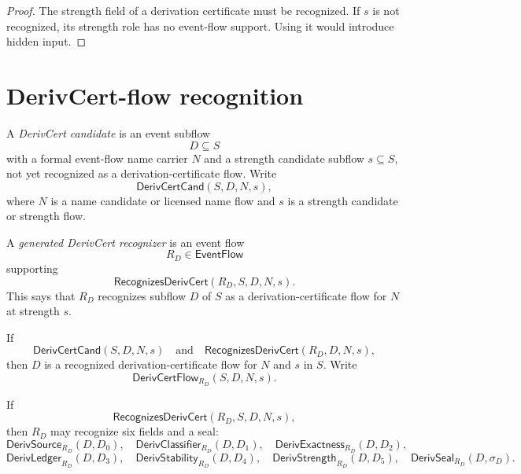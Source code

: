 \begin{proof}
The strength field of a derivation certificate must be recognized. If $s$ is not recognized, its strength role has no event-flow support. Using it would introduce hidden input.
\end{proof}

\section{DerivCert-flow recognition}
\label{sec:deriv-accept-derivcert-recognition}

\begin{definition}
\label{def:deriv-accept-derivcert-candidate}
A \emph{DerivCert candidate} is an event subflow
$$
  D\subseteq S
$$
with a formal event-flow name carrier $N$ and a strength candidate subflow $s\subseteq S$, not yet recognized as a derivation-certificate flow. Write
$$
  \mathsf{DerivCertCand}(S,D,N,s),
$$
where $N$ is a name candidate or licensed name flow and $s$ is a strength candidate or strength flow.
\end{definition}

\begin{definition}
\label{def:deriv-accept-generated-derivcert-recognizer}
A \emph{generated DerivCert recognizer} is an event flow
$$
  R_D\in\mathsf{EventFlow}
$$
supporting
$$
  \mathsf{RecognizesDerivCert}(R_D,S,D,N,s).
$$
This says that $R_D$ recognizes subflow $D$ of $S$ as a derivation-certificate flow for $N$ at strength $s$.
\end{definition}

\begin{definition}
\label{def:deriv-accept-recognized-derivcert-flow}
If
$$
  \mathsf{DerivCertCand}(S,D,N,s)
  \quad\text{and}\quad
  \mathsf{RecognizesDerivCert}(R_D,D,N,s),
$$
then $D$ is a recognized derivation-certificate flow for $N$ and $s$ in $S$. Write
$$
  \mathsf{DerivCertFlow}_{R_D}(S,D,N,s).
$$
\end{definition}

\begin{definition}
\label{def:deriv-accept-derivcert-fields}
If
$$
  \mathsf{RecognizesDerivCert}(R_D,S,D,N,s),
$$
then $R_D$ may recognize six fields and a seal:
$$
  \mathsf{DerivSource}_{R_D}(D,D_0),\quad
  \mathsf{DerivClassifier}_{R_D}(D,D_1),\quad
  \mathsf{DerivExactness}_{R_D}(D,D_2),
$$
$$
  \mathsf{DerivLedger}_{R_D}(D,D_3),\quad
  \mathsf{DerivStability}_{R_D}(D,D_4),\quad
  \mathsf{DerivStrength}_{R_D}(D,D_5),\quad
  \mathsf{DerivSeal}_{R_D}(D,\sigma_D).
$$
\end{definition}


